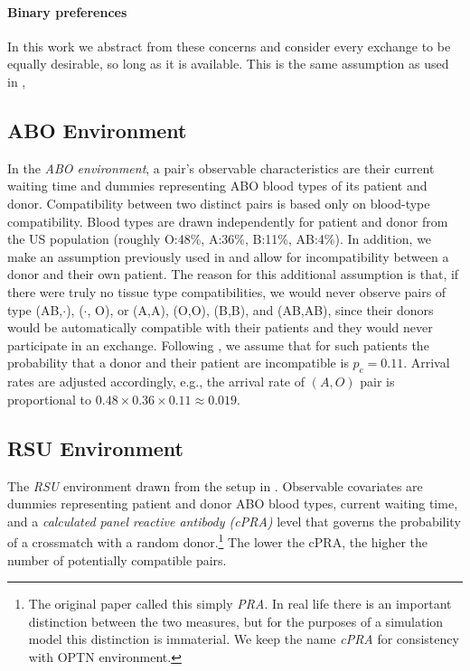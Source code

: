 \documentclass[format=acmsmall, review=false]{acmart}
\begin{document}
\paragraph{Binary preferences} In this work we abstract from these concerns and consider every exchange to be equally desirable, so long as it is available. This is the same assumption as used in \cite{roth2005pairwise}, 

\subsection{ABO Environment}

In the \emph{ABO environment}, a pair's observable characteristics are their current waiting time and dummies representing ABO blood types of its patient and donor. Compatibility between two distinct pairs is based only on blood-type compatibility. Blood types are drawn independently for patient and donor from the US population (roughly O:48\%, A:36\%, B:11\%, AB:4\%). In addition, we make an assumption previously used in \citet{unver2010dynamic} and allow for incompatibility between a donor and their own patient. The reason for this additional assumption is that, if there were truly no tissue type compatibilities, we would never observe pairs of type (AB,$\cdot$), ($\cdot$, O), or (A,A), (O,O), (B,B), and (AB,AB), since their donors would be automatically compatible with their patients and they would never participate in an exchange. Following \citet{zenios2001primum}, we assume that for such patients the probability that a donor and their patient are incompatible is $p_c = 0.11$. Arrival rates are adjusted accordingly, e.g., the arrival rate of $(A,O)$ pair is proportional to $0.48 \times 0.36 \times 0.11 \approx 0.019$.

\subsection{RSU Environment}

The \emph{RSU} environment drawn from the setup in \cite{roth2007efficient}. Observable covariates are dummies representing patient and donor ABO blood types, current waiting time, and a \emph{calculated panel reactive antibody (cPRA)} level that governs the probability of a crossmatch with a random donor.\footnote{The original \cite{roth2007efficient} paper called this simply \emph{PRA}. In real life there is an important distinction between the two measures, but for the purposes of a simulation model this distinction is immaterial. We keep the name \emph{cPRA} for consistency with OPTN environment.} The lower the cPRA, the higher the number of potentially compatible pairs.
\end{document}
